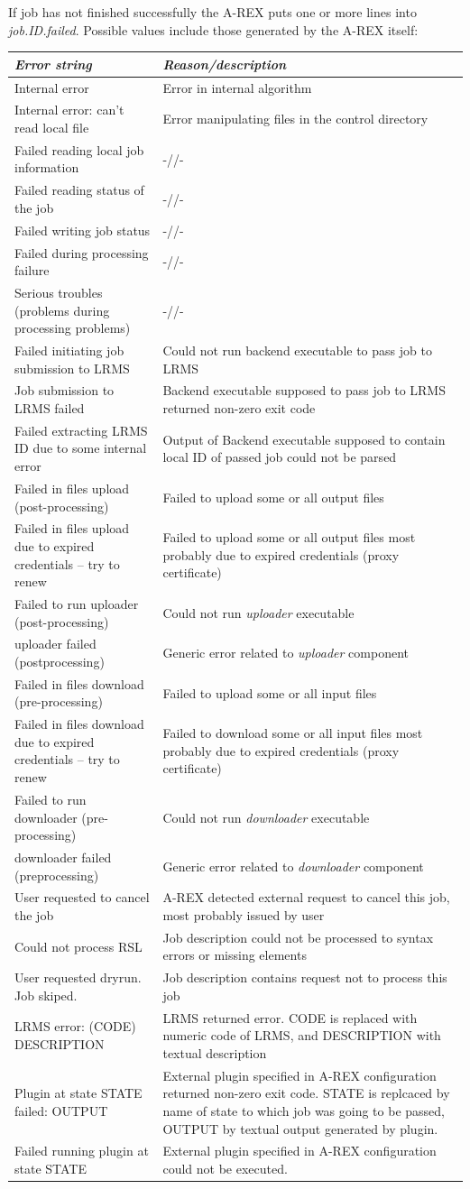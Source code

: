 \documentclass{article}                            %
\begin{document}
If job has not finished successfully the A-REX puts one or more lines
into \textit{job.ID.failed}. Possible values include those generated
by the A-REX itself:\\
\begin{longtable}{|p{5cm}|p{10cm}|}
\hline 
\emph{Error string}&
\emph{Reason/description}\tabularnewline
\hline 
Internal error&
Error in internal algorithm\tabularnewline
\hline 
Internal error: can't read local file&
Error manipulating files in the control directory\tabularnewline
\hline 
Failed reading local job information&
-//-\tabularnewline
\hline 
Failed reading status of the job&
-//-\tabularnewline
\hline 
Failed writing job status&
-//-\tabularnewline
\hline 
Failed during processing failure&
-//-\tabularnewline
\hline 
Serious troubles (problems during processing problems)&
-//-\tabularnewline
\hline 
Failed initiating job submission to LRMS&
Could not run backend executable to pass job to LRMS\tabularnewline
\hline 
Job submission to LRMS failed&
Backend executable supposed to pass job to LRMS returned non-zero
exit code\tabularnewline
\hline 
Failed extracting LRMS ID due to some internal error&
Output of Backend executable supposed to contain local ID of passed
job could not be parsed\tabularnewline
\hline 
Failed in files upload (post-processing)&
Failed to upload some or all output files\tabularnewline
\hline 
Failed in files upload due to expired credentials -- try to renew&
Failed to upload some or all output files most probably due to expired
credentials (proxy certificate)\tabularnewline
\hline 
Failed to run uploader (post-processing)&
Could not run \emph{uploader} executable\tabularnewline
\hline 
uploader failed (postprocessing)&
Generic error related to \emph{uploader} component\tabularnewline
\hline 
Failed in files download (pre-processing)&
Failed to upload some or all input files\tabularnewline
\hline 
Failed in files download due to expired credentials -- try to renew&
Failed to download some or all input files most probably due to expired
credentials (proxy certificate)\tabularnewline
\hline 
Failed to run downloader (pre-processing)&
Could not run \emph{downloader} executable\tabularnewline
\hline
downloader failed (preprocessing)&
Generic error related to \emph{downloader} component\tabularnewline
\hline
User requested to cancel the job&
A-REX detected external request to cancel this job, most probably
issued by user\tabularnewline
\hline
Could not process RSL&
Job description could not be processed to syntax errors or missing
elements\tabularnewline
\hline
User requested dryrun. Job skiped.&
Job description contains request not to process this job\tabularnewline
\hline
LRMS error: (CODE) DESCRIPTION&
LRMS returned error. CODE is replaced with numeric code of LRMS, and
DESCRIPTION with textual description\tabularnewline
\hline
Plugin at state STATE failed: OUTPUT&
External plugin specified in A-REX configuration returned non-zero
exit code. STATE is replcaced by name of state to which job was going
to be passed, OUTPUT by textual output generated by plugin.\tabularnewline
\hline
Failed running plugin at state STATE&
External plugin specified in A-REX configuration could not be executed.\tabularnewline
\hline
\end{longtable}
\end{document}
